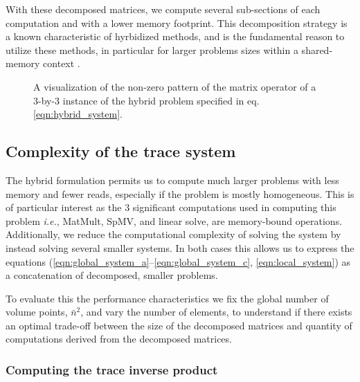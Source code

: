 \noindent
With these decomposed matrices, we compute several sub-sections of each computation and with a lower memory footprint. This decomposition strategy
is a known characteristic of hyrbidized methods, and is the fundamental 
reason to utilize these methods, in particular for larger problems sizes
within a shared-memory context \citep{kozdon2021hybridized, 
kolev2021efficient, fernandez2017hybridized}. 

\begin{figure}
	\centering
	
	\caption{A visualization of the non-zero pattern of the matrix 
	operator of a 3-by-3 instance of the hybrid problem specified 
	in eq. \eqref{eqn:hybrid_system}.}
	\label{fig:block_diagram}
\end{figure}

\subsection{Complexity of the trace system} %


The hybrid formulation permits us to compute much larger problems with 
less memory and fewer reads, especially if the problem is mostly 
homogeneous. This is of particular interest as the 3 significant 
computations used in computing this problem \emph{i.e.}, MatMult, SpMV, 
and linear solve, are memory-bound operations. Additionally, we 
reduce the computational complexity of solving the system by instead 
solving several smaller systems. In both cases this allows us to express 
the equations (\ref{eqn:global_system_a}--\ref{eqn:global_system_c}, 
\ref{eqn:local_system}) as a concatenation of decomposed, smaller problems.

To evaluate this the performance characteristics we fix the global number 
of volume points, $\bar{n}^2$, and vary the number of elements, to 
understand if there exists an optimal trade-off between the size of the 
decomposed matrices and quantity of computations derived from the 
decomposed matrices.

\subsubsection{Computing the trace inverse product} %

